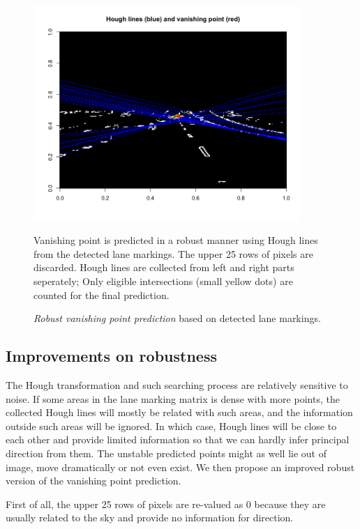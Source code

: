 \documentclass[11pt, oneside]{article}
\begin{document}
\begin{figure}[!ht]
  \centering
      \includegraphics[width=0.9\textwidth]{Rplot2.png}
      
{\footnotesize Vanishing point is predicted in a robust manner using Hough lines from the detected lane markings. The upper 25 rows of pixels are discarded. Hough lines are collected from left and right parts seperately; Only eligible intersections (small yellow dots) are counted for the final prediction. \par}  \caption{\textit{Robust vanishing point prediction} based on detected lane markings. }

\end{figure}



\subsection*{Improvements on robustness}

The Hough transformation and such searching process are relatively sensitive to noise. If some areas in the lane marking matrix is dense with more points, the collected Hough lines will mostly be related with such areas, and the information outside such areas will be ignored. In which case, Hough lines will be close to each other and provide limited information so that we can hardly infer principal direction from them.  The unstable predicted points might as well lie out of image, move dramatically or not even exist. We then propose an improved robust version of the vanishing point prediction.

First of all, the upper 25 rows of pixels are re-valued as $0$ because they are usually related to the sky and provide no information for direction. 
\end{document}
